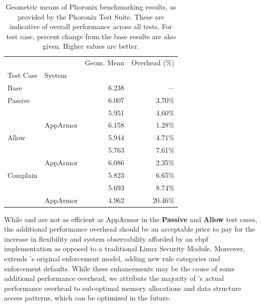 \begin{table}[ht]
  \centering
  \footnotesize
  \caption[Geometric means of Phoronix benchmarking results]{
    Geometric means of Phoronix benchmarking results, as provided by the Phoronix Test
    Suite. These are indicative of overall performance across all tests. For test case,
    percent change from the base results are also given. Higher values are better.
  }%
  \label{tab:phoronix-geometric}
  \begin{tabular}{llrr}
  \toprule
             &               & Geom. Mean & Overhead (\%)\\
   Test Case & System        &            &              \\
   \midrule
   Base      &               & 6.238          & --- \\
   \cline{1-4}
   Passive   & \bpfbox{}     & 6.007          & 3.70\% \\
             & \bpfcontain{} & 5.951          & 4.60\% \\
             & AppArmor      & 6.158          & 1.28\% \\
   \cline{1-4}
   Allow     & \bpfbox{}     & 5.944          & 4.71\% \\
             & \bpfcontain{} & 5.763          & 7.61\% \\
             & AppArmor      & 6.086          & 2.35\% \\
   \cline{1-4}
   Complain  & \bpfbox{}     & 5.823          & 6.65\% \\
             & \bpfcontain{} & 5.693          & 8.74\% \\
             & AppArmor      & 4.962          & 20.46\% \\
  \bottomrule
  \end{tabular}
\end{table}

While \bpfbox{} and \bpfcontain{} are not as efficient as AppArmor in the \textbf{Passive}
and \textbf{Allow}  test cases, the additional performance overhead should be an
acceptable price to pay for the increase in flexibility and system observability afforded
by an \gls{ebpf} implementation as opposed to a traditional Linux Security Module.
Moreover, \bpfcontain{} extends \bpfbox{}'s original enforcement model, adding new rule categories
and enforcement defaults. While these enhancements may be the cause of some additional
performance overhead, we attribute the majority of \bpfcontain{}'s actual performance
overhead to sub-optimal memory allocations and data structure access patterns, which can
be optimized in the future.

